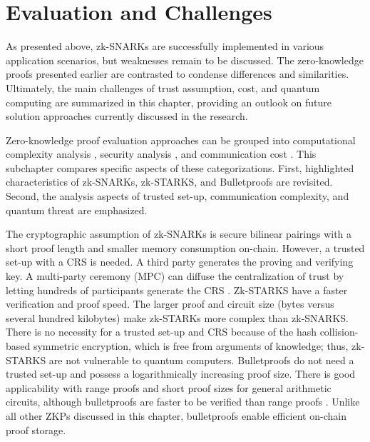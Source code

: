 \section{Evaluation and Challenges}
As presented above, zk-SNARKs are successfully implemented in various application scenarios, but weaknesses remain to be discussed. The zero-knowledge proofs presented earlier are contrasted to condense differences and similarities. Ultimately, the main challenges of trust assumption, cost, and quantum computing are summarized in this chapter, providing an outlook on future solution approaches currently discussed in the research.

Zero-knowledge proof evaluation approaches can be grouped into computational complexity analysis \citep{LiuWangPengXing, SONIC10.1145/3319535.3339817, PipeZK}, security analysis \citep{Huangetal}, and communication cost \citep{ZHENG, liuetal, gongetal}. This subchapter compares specific aspects of these categorizations. First, highlighted characteristics of zk-SNARKs, zk-STARKS, and Bulletproofs are revisited. Second, the analysis aspects of trusted set-up, communication complexity, and quantum threat are emphasized. 

The cryptographic assumption of zk-SNARKs is secure bilinear pairings with a short proof length and smaller memory consumption on-chain. However, a trusted set-up with a CRS is needed. A third party generates the proving and verifying key. A multi-party ceremony (MPC) can diffuse the centralization of trust by letting hundreds of participants generate the CRS \citep{liuetal}. Zk-STARKS have a faster verification and proof speed. The larger proof and circuit size (bytes versus several hundred kilobytes) make zk-STARKs more complex than zk-SNARKS. There is no necessity for a trusted set-up and CRS because of the hash collision-based symmetric encryption, which is free from arguments of knowledge; thus, zk-STARKS are not vulnerable to quantum computers. Bulletproofs do not need a trusted set-up and possess a logarithmically increasing proof size. There is good applicability with range proofs and short proof sizes for general arithmetic circuits, although bulletproofs are faster to be verified than range proofs \citep{gongetal}. Unlike all other ZKPs discussed in this chapter, bulletproofs enable efficient on-chain proof storage. 

